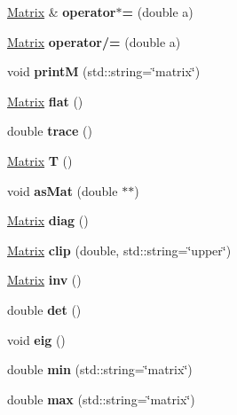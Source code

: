 \begin{DoxyCompactItemize}
\mbox{\label{classMatrix_a4bd84764194d66b36df5134992bbfdcc}} 
\hyperlink{classMatrix}{Matrix} \& {\bfseries operator$\ast$=} (double a)
\item 
\mbox{\label{classMatrix_ae0dffcc49e94db64e5f85f49622b4f3b}} 
\hyperlink{classMatrix}{Matrix} {\bfseries operator/=} (double a)
\item 
\mbox{\label{classMatrix_ad9db57feb80b159997d121a8d55c055c}} 
void {\bfseries printM} (std\+::string=\char`\"{}matrix\char`\"{})
\item 
\mbox{\label{classMatrix_a347fdd0b8505557b28376d36fd965647}} 
\hyperlink{classMatrix}{Matrix} {\bfseries flat} ()
\item 
\mbox{\label{classMatrix_af7403d8c02553a4fba253380e4e0bc40}} 
double {\bfseries trace} ()
\item 
\mbox{\label{classMatrix_a4e2ee8ad0e6621315f6b68034114ba74}} 
\hyperlink{classMatrix}{Matrix} {\bfseries T} ()
\item 
\mbox{\label{classMatrix_a84d6198a8bbb5637b85ecb4c58e34cb8}} 
void {\bfseries as\+Mat} (double $\ast$$\ast$)
\item 
\mbox{\label{classMatrix_a9ab1bacd38c2090314786bba2844da3c}} 
\hyperlink{classMatrix}{Matrix} {\bfseries diag} ()
\item 
\mbox{\label{classMatrix_a8975aa6c948bcc13588fbc580bd975ed}} 
\hyperlink{classMatrix}{Matrix} {\bfseries clip} (double, std\+::string=\char`\"{}upper\char`\"{})
\item 
\mbox{\label{classMatrix_a7611488b98f9c291c86cb2ea47b1b56a}} 
\hyperlink{classMatrix}{Matrix} {\bfseries inv} ()
\item 
\mbox{\label{classMatrix_ace95025dd985ddaa6c1ed72e8b464a0a}} 
double {\bfseries det} ()
\item 
\mbox{\label{classMatrix_a57f323186a181dd2ed6519b0f86f4338}} 
void {\bfseries eig} ()
\item 
\mbox{\label{classMatrix_a6edacac0a051ed4a8e4c93adb6ff3de2}} 
double {\bfseries min} (std\+::string=\char`\"{}matrix\char`\"{})
\item 
\mbox{\label{classMatrix_ad290e450fead39c024466cf0ba602c7e}} 
double {\bfseries max} (std\+::string=\char`\"{}matrix\char`\"{})
\end{DoxyCompactItemize}
